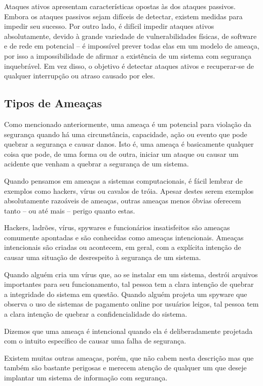 \documentclass[
	10pt,				%
	openright,			%
	twoside,			%
	a5paper,			%
	english,			%
	french,				%
	spanish,			%
	brazil,				%
	sumario=tradicional
]{abntex2}
\begin{document}
Ataques ativos apresentam características opostas às dos ataques passivos. Embora os ataques passivos sejam difíceis de detectar, existem medidas para impedir seu sucesso. Por outro lado, é difícil impedir ataques ativos absolutamente, devido à grande variedade de vulnerabilidades físicas, de software e de rede em potencial – é impossível prever todas elas em um modelo de ameaça, por isso a impossibilidade de afirmar a existência de um sistema com segurança inquebrável. Em vez disso, o objetivo é detectar ataques ativos e recuperar-se de qualquer interrupção ou atraso causado por eles.

\subsection{Tipos de Ameaças}

Como mencionado anteriormente, uma ameaça é um potencial para violação da segurança quando há uma circunstância, capacidade, ação ou evento que pode quebrar a segurança e causar danos. Isto é, uma ameaça é basicamente qualquer coisa que pode, de uma forma ou de outra, iniciar um ataque ou causar um acidente que venham a quebrar a segurança de um sistema.

Quando pensamos em ameaças a sistemas computacionais, é fácil lembrar de exemplos como hackers, vírus ou cavalos de tróia. Apesar destes serem exemplos absolutamente razoáveis de ameaças, outras ameaças menos óbvias oferecem tanto – ou até mais – perigo quanto estas.

Hackers, ladrões, vírus, spywares e funcionários insatisfeitos são ameaças comumente apontadas e são conhecidas como ameaças intencionais. Ameaças intencionais são criadas ou acontecem, em geral, com a explícita intenção de causar uma situação de desrespeito à segurança de um sistema. 

Quando alguém cria um vírus que, ao se instalar em um sistema, destrói arquivos importantes para seu funcionamento, tal pessoa tem a clara intenção de quebrar a integridade do sistema em questão. Quando alguém projeta um spyware que observa o uso de sistemas de pagamento online por usuários leigos, tal pessoa tem a clara intenção de quebrar a confidencialidade do sistema.

Dizemos que uma ameaça é intencional quando ela é deliberadamente projetada com o intuito específico de causar uma falha de segurança.

Existem muitas outras ameaças, porém, que não cabem nesta descrição mas que também são bastante perigosas e merecem atenção de qualquer um que deseje implantar um sistema de informação com segurança.
\end{document}
